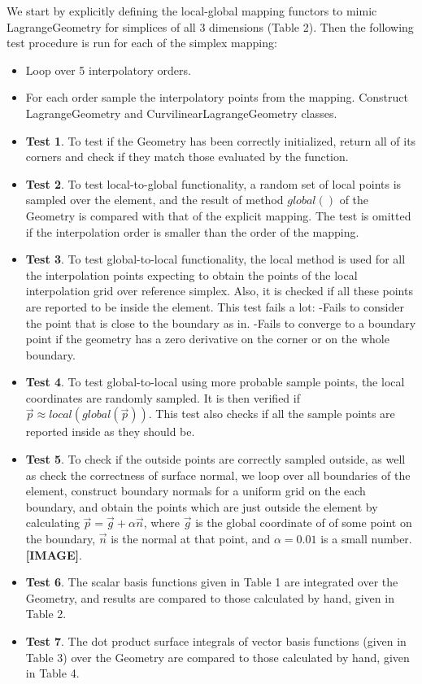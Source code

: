 We start by explicitly defining the local-global mapping functors to mimic LagrangeGeometry for simplices of all 3 dimensions (Table 2). Then the following test procedure is run for each of the simplex mapping:
\begin{itemize}
	\item Loop over 5 interpolatory orders.
	\item For each order sample the interpolatory points from the mapping. Construct LagrangeGeometry and CurvilinearLagrangeGeometry classes.
	\item \textbf{Test 1}. To test if the Geometry has been correctly initialized, return all of its corners and check if they match those evaluated by the function.
	\item \textbf{Test 2}. To test local-to-global functionality, a random set of local points is sampled over the element, and the result of method $global()$ of the Geometry is compared with that of the explicit mapping. The test is omitted if the interpolation order is smaller than the order of the mapping.
	\item \textbf{Test 3}. To test global-to-local functionality, the local method is used for all the interpolation points expecting to obtain the points of the local interpolation grid over reference simplex. Also, it is checked if all these points are reported to be inside the element. This test fails a lot:
		\subitem -Fails to consider the point that is close to the boundary as in.
		\subitem -Fails to converge to a boundary point if the geometry has a zero derivative on the corner or on the whole boundary.
	\item \textbf{Test 4}. To test global-to-local using more probable sample points, the local coordinates are randomly sampled. It is then verified if $\vec{p} \approx local(global(\vec{p}))$. This test also checks if all the sample points are reported inside as they should be.
	\item \textbf{Test 5}. To check if the outside points are correctly sampled outside, as well as check the correctness of surface normal, we loop over all boundaries of the element, construct boundary normals for a uniform grid on the each boundary, and obtain the points which are just outside the element by calculating $\vec{p} = \vec{g} + \alpha \vec{n}$, where $\vec{g}$ is the global coordinate of of some point on the boundary, $\vec{n}$ is the normal at that point, and $\alpha = 0.01$ is a small number. \textbf{[IMAGE]}.
	\item \textbf{Test 6}. The scalar basis functions given in Table 1 are integrated over the Geometry, and results are compared to those calculated by hand, given in Table 2.
	\item \textbf{Test 7}. The dot product surface integrals of vector basis functions (given in Table 3) over the Geometry are compared to those calculated by hand, given in Table 4.
\end{itemize}

